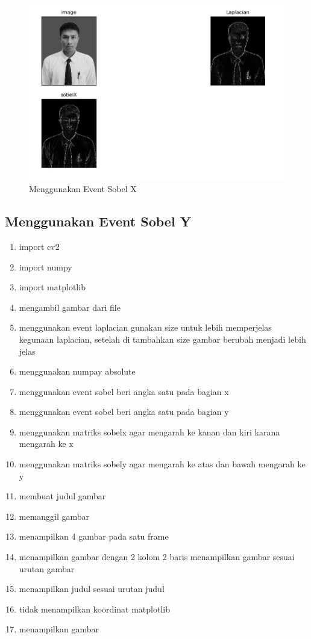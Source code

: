 \begin{figure}[ht]
\centering
\includegraphics[scale=0.5]{figures/2,66.jpg}
\caption{Menggunakan Event Sobel X}
\label{contoh}
\end{figure}







\newpage
\subsection{Menggunakan Event Sobel Y}

\begin{enumerate}
	\item import cv2
	\item import numpy
	\item import matplotlib
	\item mengambil gambar dari file
	\item menggunakan event laplacian gunakan size untuk lebih memperjelas kegunaan laplacian, setelah di tambahkan size gambar berubah menjadi lebih jelas
	\item menggunakan numpay absolute
	\item menggunakan event sobel beri angka satu pada bagian x
	\item menggunakan event sobel beri angka satu pada bagian y
	\item menggunakan matriks sobelx agar mengarah ke kanan dan kiri karana mengarah ke x
	\item menggunakan matriks sobely agar mengarah ke atas dan bawah mengarah ke y
	\item membuat judul gambar
	\item memanggil gambar
	\item menampilkan 4 gambar pada satu frame
	\item menampilkan gambar dengan 2 kolom 2 baris menampilkan gambar sesuai urutan gambar
	\item menampilkan judul sesuai urutan judul
	\item tidak menampilkan koordinat matplotlib
	\item menampilkan gambar
\end{enumerate}

